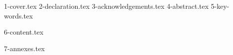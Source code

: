 \documentclass[12pt,a4paper,oneside]{book}
\begin{document}
{1-cover.tex}
{2-declaration.tex}
{3-acknowledgements.tex}
{4-abstract.tex}
{5-key-words.tex}
\tableofcontents


{6-content.tex}




{7-annexes.tex}
\end{document}
